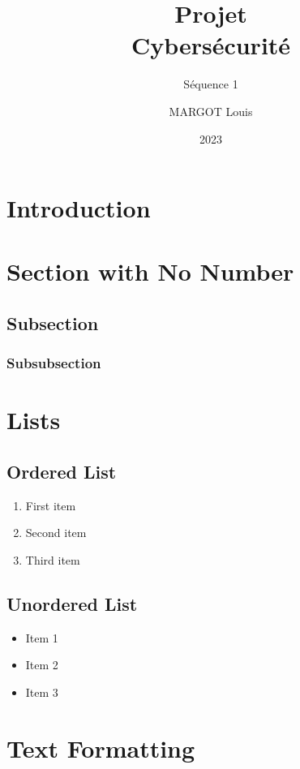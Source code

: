 \documentclass[12pt,a4paper,french]{designreport}
\title{Projet\\Cybersécurité}
\subtitle{Séquence 1}
\author{\uppercase{Margot} Louis}
\date{2023}
\begin{document}
\maketitle  %

\tableofcontents  %
\newpage  %

\section{Introduction}

\lipsum[1-2]

\section*{Section with No Number}
\lipsum[3-4]

\subsection{Subsection}
\lipsum[5-6]

\subsubsection{Subsubsection}
\lipsum[7]

\section{Lists}
\subsection{Ordered List}
\begin{enumerate}
  \item First item
  \item Second item
  \item Third item
\end{enumerate}

\subsection{Unordered List}
\begin{itemize}
  \item Item 1
  \item Item 2
  \item Item 3
\end{itemize}

\section{Text Formatting}
\end{document}
